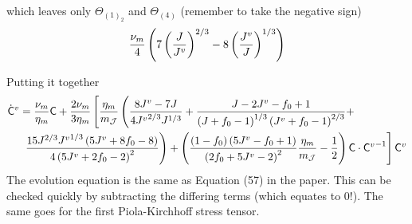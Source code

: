 \documentclass{beamer}
\def\myC{{\bf\mathsf{C}}}
\begin{document}
    \begin{frame}
        \begin{block}{\footnotesize which leaves only $\Theta_{(1)_2}$ and $\Theta_{(4)}$ (remember to take the negative sign) }
            \footnotesize\begin{align*}
                \frac{ \nu _m}{4} \left(7 \left(\frac{J}{{J^v}}\right)^{2/3}
                -
                8\left(\frac{J^v}{J}\right)^{1/3}\right)
            \end{align*}
        \end{block}
        \begin{block}{\footnotesize Putting it together}
            \footnotesize\begin{align*}
                \dot{\myC}^v
               & =
                \frac{\nu_m}{\eta_m}\myC
                +
                \frac{2\nu_m}{3\eta_m}\left[
                    \frac{\eta_m}{m_\mathcal{J}}\left(
                        \frac{8J^v-7J}{4{J^v}^{2/3}J^{1/3}}
                        +\frac{J - 2 {J^v} - f_0 + 1}{\lr{J+f_0 - 1}^{1/3} \left({J^v}+f_0-1\right)^{2/3}}+\right.\right. \\ &\left.\left.
                        \, \frac{15J^{2/3} {J^v}^{1/3}
                        \left(
                            5 {J^v} + 8 f_0 - 8
                        \right)}{4\left(5 {J^v} + 2 f_0 -2\right)^2}
                    \right)
                    + \lr{
                        \frac{\lr{1-f_0}\left(5 J^v -f_0 + 1\right)}{\left(2 f_0+5 J^v-2\right)^2}\frac{\eta_m}{m_\mathcal{J}}-\frac{1}{2}
                    }\myC\cdot{\myC^v}^{-1}
                \right]\myC^v
            \end{align*}
        The evolution equation is the same as Equation (57) in the paper. This can be checked quickly by subtracting the differing terms (which equates to 0!). The same goes for the first Piola-Kirchhoff stress tensor.
        \end{block}
    \end{frame}
\end{document}

